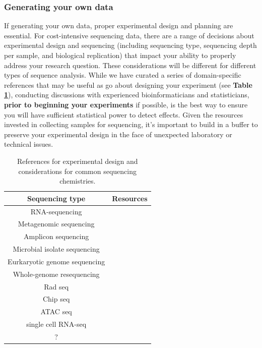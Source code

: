 \documentclass[10pt,letterpaper]{article}
\begin{document}

\subsubsection*{Generating your own data}
If generating your own data, proper experimental design and planning are essential. 
For cost-intensive sequencing data, there are a range of decisions about experimental design and sequencing (including sequencing type, sequencing depth per sample, and biological replication) that impact your ability to properly address your research question. 
These considerations will be different for different types of sequence analysis. 
While we have curated a series of domain-specific references that may be useful as go about designing your experiment (see \textbf{Table \ref{tab:seq_resources}}), conducting discussions with experienced bioinformaticians and statisticians, \textbf{prior to beginning your experiments} if possible, is the best way to ensure you will have sufficient statistical power to detect effects.
Given the resources invested in collecting samples for sequencing, it's important to build in a buffer to preserve your experimental design in the face of unexpected laboratory or technical issues. 

\begin{table}
\begin{tabular}{|c|c|}
\hline
\textbf{Sequencing type} & \textbf{Resources} \\
\hline
RNA-sequencing & \cite{conesa2016, schurch2016, ching2014} \\
\hline
Metagenomic sequencing & \cite{knight2012, quince2017, eisenhofer2019} \\
\hline
Amplicon sequencing & \cite{mclaren2019, murray2015, sinha2017 } \\
\hline
Microbial isolate sequencing & \cite{liao2015} \\
\hline
Eurkaryotic genome sequencing & \\
\hline
Whole-genome resequencing & \cite{fuentes2017} \\
\hline
Rad seq & \\
\hline
Chip seq & \\
\hline
ATAC seq & \\
\hline
single cell RNA-seq & \cite{bacher2016, haque2017} \\
\hline
? & \\
\hline
\end{tabular} 
\caption{\label{tab:seq_resources} References for experimental design and considerations for common sequencing chemistries.}
\end{table}
\end{document}
